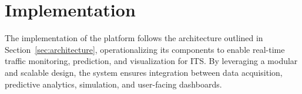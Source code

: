 
\section{Implementation}

The implementation of the \digit platform follows the architecture outlined in Section~\ref{sec:architecture}, operationalizing its components to enable real-time traffic monitoring, prediction, and visualization for ITS. By leveraging a modular and scalable design, the system ensures integration between data acquisition, predictive analytics, simulation, and user-facing dashboards. 

